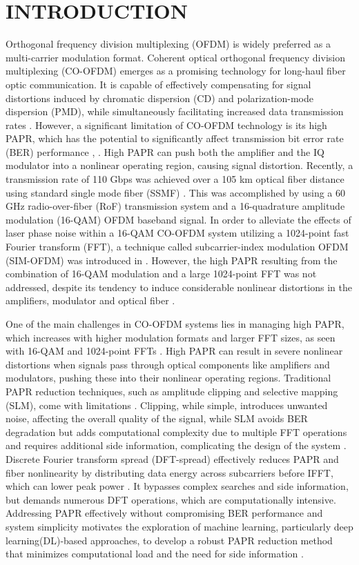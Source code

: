 \documentclass[conference]{IEEEtran}
\begin{document}
\section{INTRODUCTION}
Orthogonal frequency division multiplexing (OFDM) is widely preferred as a multi-carrier modulation format. Coherent optical orthogonal frequency division multiplexing (CO-OFDM) emerges as a promising technology for long-haul fiber optic communication. It is capable of effectively compensating for signal distortions induced by chromatic dispersion (CD) and polarization-mode dispersion (PMD), while simultaneously facilitating increased data transmission rates \cite{b1}. However, a significant limitation of CO-OFDM technology is its high PAPR, which has the potential to significantly affect transmission bit error rate (BER) performance \cite{b2}, \cite{b3}. High PAPR can push both the amplifier and the IQ modulator into a nonlinear operating region, causing signal distortion. Recently, a transmission rate of 110 Gbps was achieved over a 105 km optical fiber distance using standard single mode fiber (SSMF) \cite{b4}. This was accomplished by using a 60 GHz radio-over-fiber (RoF) transmission system and a 16-quadrature amplitude modulation (16-QAM) OFDM baseband signal. In order to alleviate the effects of laser phase noise within a 16-QAM CO-OFDM system utilizing a 1024-point fast Fourier transform (FFT), a technique called subcarrier-index modulation OFDM (SIM-OFDM) was introduced in \cite{b5}. However, the high PAPR resulting from the combination of 16-QAM modulation and a large 1024-point FFT was not addressed, despite its tendency to induce considerable nonlinear distortions in the amplifiers, modulator and optical fiber \cite{b6}.

One of the main challenges in CO-OFDM systems lies in managing high PAPR, which increases with higher modulation formats and larger FFT sizes, as seen with 16-QAM and 1024-point FFTs \cite{b7}. High PAPR can result in severe nonlinear distortions when signals pass through optical components like amplifiers and modulators, pushing these into their nonlinear operating regions. Traditional PAPR reduction techniques, such as amplitude clipping and selective mapping (SLM), come with limitations \cite{b8}. Clipping, while simple, introduces unwanted noise, affecting the overall quality of the signal, while SLM avoids BER degradation but adds computational complexity due to multiple FFT operations and requires additional side information, complicating the design of the system \cite{b9}. Discrete Fourier transform spread (DFT-spread) effectively reduces PAPR and fiber nonlinearity by distributing data energy across subcarriers before IFFT, which can lower peak power \cite{b10}. It bypasses complex searches and side information, but demands numerous DFT operations, which are computationally intensive. Addressing PAPR effectively without compromising BER performance and system simplicity motivates the exploration of machine learning, particularly deep learning(DL)-based approaches, to develop a robust PAPR reduction method that minimizes computational load and the need for side information \cite{b11}.
\end{document}

